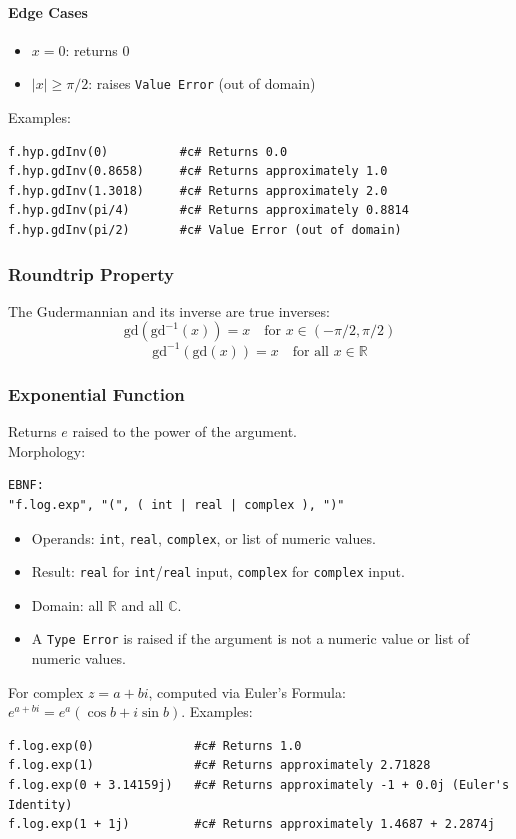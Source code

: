 \paragraph{Edge Cases}
\begin{itemize}
\item $x = 0$: returns $0$
\item $|x| \geq \pi/2$: raises \texttt{Value Error} (out of domain)
\end{itemize}

Examples:
\begin{verbatim}
f.hyp.gdInv(0)          #c# Returns 0.0
f.hyp.gdInv(0.8658)     #c# Returns approximately 1.0
f.hyp.gdInv(1.3018)     #c# Returns approximately 2.0
f.hyp.gdInv(pi/4)       #c# Returns approximately 0.8814
f.hyp.gdInv(pi/2)       #c# Value Error (out of domain)
\end{verbatim}

\subsubsection{Roundtrip Property}
The Gudermannian and its inverse are true inverses:
\[
\text{gd}(\text{gd}^{-1}(x)) = x \quad \text{for } x \in (-\pi/2, \pi/2)
\]
\[
\text{gd}^{-1}(\text{gd}(x)) = x \quad \text{for all } x \in \mathbb{R}
\]

\subsubsection{Exponential Function}
Returns $e$ raised to the power of the argument. \\
Morphology:
\begin{verbatim}
EBNF:
"f.log.exp", "(", ( int | real | complex ), ")"
\end{verbatim}
\begin{itemize}
\item Operands: \texttt{int}, \texttt{real}, \texttt{complex}, or list of numeric values.
\item Result: \texttt{real} for \texttt{int}/\texttt{real} input, \texttt{complex} for \texttt{complex} input.
\item Domain: all $\mathbb{R}$ and all $\mathbb{C}$.
\item A \texttt{Type Error} is raised if the argument is not a numeric value or list of numeric values.
\end{itemize}
For complex $z = a + bi$, computed via Euler's Formula: $e^{a+bi} = e^a(\cos b + i \sin b)$.
Examples:
\begin{verbatim}
f.log.exp(0)              #c# Returns 1.0
f.log.exp(1)              #c# Returns approximately 2.71828
f.log.exp(0 + 3.14159j)   #c# Returns approximately -1 + 0.0j (Euler's Identity)
f.log.exp(1 + 1j)         #c# Returns approximately 1.4687 + 2.2874j
\end{verbatim}

